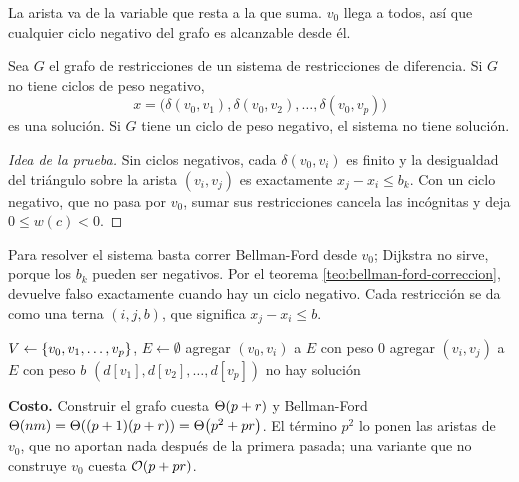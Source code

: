 \documentclass[11pt,letterpaper]{article}
\begin{document}
La arista va de la variable que resta a la que suma. $v_0$ llega a
todos, así que cualquier ciclo negativo del grafo es alcanzable desde
él.

\begin{teorema}\label{teo:restricciones-solucion}
  Sea $G$ el grafo de restricciones de un sistema de restricciones de
  diferencia. Si $G$ no tiene ciclos de peso negativo,
  \[
    x = \bigl(\delta(v_0, v_1), \delta(v_0, v_2), \dots,
             \delta(v_0, v_p)\bigr)
  \]
  es una solución. Si $G$ tiene un ciclo de peso negativo, el sistema
  no tiene solución.
\end{teorema}

\begin{proof}[Idea de la prueba]
  Sin ciclos negativos, cada $\delta(v_0, v_i)$ es finito y la
  desigualdad del triángulo sobre la arista $(v_i, v_j)$ es
  exactamente $x_j - x_i \le b_k$. Con un ciclo negativo, que no pasa
  por $v_0$, sumar sus restricciones cancela las incógnitas y deja
  $0 \le w(c) < 0$.
\end{proof}

Para resolver el sistema basta correr Bellman-Ford desde $v_0$;
Dijkstra no sirve, porque los $b_k$ pueden ser negativos. Por el
teorema \ref{teo:bellman-ford-correccion}, devuelve falso exactamente
cuando hay un ciclo negativo. Cada restricción se da como una terna
$(i, j, b)$, que significa $x_j - x_i \le b$.

\begin{algorithm}[H]
\caption{\textsc{Resolver-Restricciones}$(p, R)$}
\label{alg:resolver-restricciones}
\begin{algorithmic}[1]
  \State $V \gets \left\{ v_0, v_1, \dots, v_p \right\}$, \quad $E \gets \emptyset$
    \State agregar $(v_0, v_i)$ a $E$ con peso $0$
  \EndFor
    \State agregar $(v_i, v_j)$ a $E$ con peso $b$
  \EndFor
    \State \Return $(d[v_1], d[v_2], \dots, d[v_p])$
  \Else
    \State \Return no hay solución 
  \EndIf
\EndProcedure
\end{algorithmic}
\end{algorithm}

\textbf{Costo.} Construir el grafo cuesta $\Theta\!\left(p + r\right)$ y Bellman-Ford
$\Theta\!\left(nm\right) = \Theta\!\left((p + 1)(p + r)\right) = \Theta\!\left(p^2 + pr\right)$. El término $p^2$
lo ponen las aristas de $v_0$, que no aportan nada después de la
primera pasada; una variante que no construye $v_0$ cuesta
$\mathcal{O}\!\left(p + pr\right)$.
\end{document}
